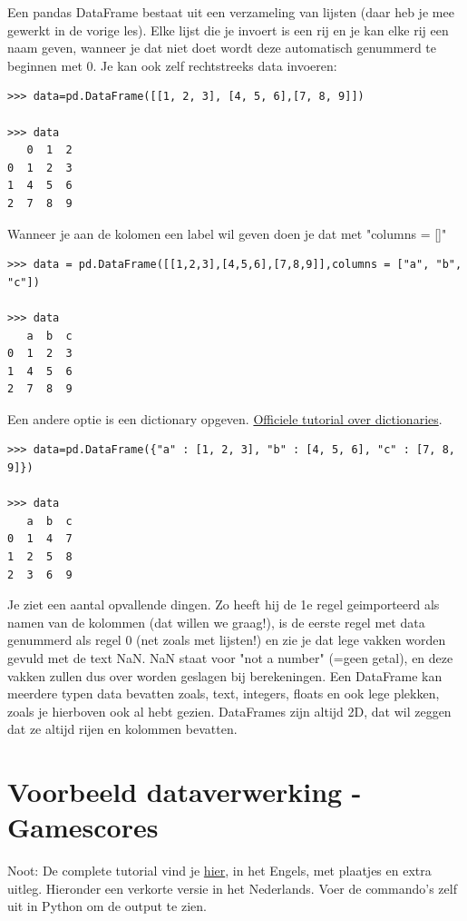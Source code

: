 Een pandas DataFrame bestaat uit een verzameling van lijsten (daar heb je mee gewerkt in de vorige les). Elke lijst die je invoert is een rij en je kan elke rij een naam geven, wanneer je dat niet doet wordt deze automatisch genummerd te beginnen met 0.
Je kan ook zelf rechtstreeks data invoeren:

\begin{lstlisting}[frame=single]
>>> data=pd.DataFrame([[1, 2, 3], [4, 5, 6],[7, 8, 9]])

>>> data
   0  1  2
0  1  2  3
1  4  5  6
2  7  8  9

\end{lstlisting}
Wanneer je aan de kolomen een label wil geven doen je dat met "columns = []"

\begin{lstlisting}[frame=single]
>>> data = pd.DataFrame([[1,2,3],[4,5,6],[7,8,9]],columns = ["a", "b", "c"])

>>> data
   a  b  c
0  1  2  3
1  4  5  6
2  7  8  9

\end{lstlisting}
Een andere optie is een dictionary opgeven. \href{https://docs.python.org/2/tutorial/datastructures.html#dictionaries}{Officiele tutorial over dictionaries}.

\begin{lstlisting}[frame=single]
>>> data=pd.DataFrame({"a" : [1, 2, 3], "b" : [4, 5, 6], "c" : [7, 8, 9]})

>>> data
   a  b  c
0  1  4  7
1  2  5  8
2  3  6  9

\end{lstlisting}
Je ziet een aantal opvallende dingen. Zo heeft hij de 1e regel geimporteerd als namen van de kolommen (dat willen we graag!), is de eerste regel met data genummerd als regel 0 (net zoals met lijsten!) en zie je dat lege vakken worden gevuld met de text NaN. NaN staat voor "not a number" (=geen getal), en deze vakken zullen dus over worden geslagen bij berekeningen.
Een DataFrame kan meerdere typen data bevatten zoals, text, integers, floats en ook lege plekken, zoals je hierboven ook al hebt gezien. DataFrames zijn altijd 2D, dat wil zeggen dat ze altijd rijen en kolommen bevatten.

\section{Voorbeeld dataverwerking - Gamescores}
Noot: De complete tutorial vind je \href{https://www.dataquest.io/blog/pandas-python-tutorial/}{hier}, in het Engels, met plaatjes en extra uitleg. Hieronder een verkorte versie in het Nederlands. Voer de commando's zelf uit in Python om de output te zien. 

